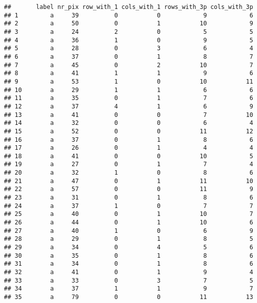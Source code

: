 \documentclass[
]{article}
\begin{document}
\begin{verbatim}
##       label nr_pix row_with_1 cols_with_1 rows_with_3p cols_with_3p
## 1         a     39          0           0            9            6
## 2         a     50          0           1           10            9
## 3         a     24          2           0            5            5
## 4         a     36          1           0            9            5
## 5         a     28          0           3            6            4
## 6         a     37          0           1            8            7
## 7         a     45          0           2           10            7
## 8         a     41          1           1            9            6
## 9         a     53          1           0           10           11
## 10        a     29          1           1            6            6
## 11        a     35          0           1            7            6
## 12        a     37          4           1            6            9
## 13        a     41          0           0            7           10
## 14        a     32          0           0            6            4
## 15        a     52          0           0           11           12
## 16        a     37          0           1            8            6
## 17        a     26          0           1            4            4
## 18        a     41          0           0           10            5
## 19        a     27          0           1            7            4
## 20        a     32          1           0            8            6
## 21        a     47          0           1           11           10
## 22        a     57          0           0           11            9
## 23        a     31          0           1            8            6
## 24        a     37          1           0            7            7
## 25        a     40          0           1           10            7
## 26        a     44          0           1           10            6
## 27        a     40          1           0            6            9
## 28        a     29          0           1            8            5
## 29        a     34          0           4            5            6
## 30        a     35          0           1            8            6
## 31        a     34          0           1            8            6
## 32        a     41          0           1            9            4
## 33        a     33          0           3            7            5
## 34        a     37          1           1            9            7
## 35        a     79          0           0           11           13

\end{verbatim}
\end{document}
